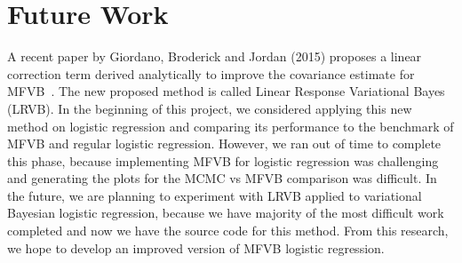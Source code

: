 
\section{Future Work}\label{sec:future}

A recent paper by Giordano, Broderick and Jordan (2015) proposes a linear correction term derived analytically to improve the covariance estimate for MFVB~\cite{giordano2015linear}.  The new proposed method is called Linear Response Variational Bayes (LRVB).  In the beginning of this project, we considered applying this new method on logistic regression and comparing its performance to the benchmark of MFVB and regular logistic regression.  However, we ran out of time to complete this phase, because implementing MFVB for logistic regression was challenging and generating the plots for the MCMC vs MFVB comparison was difficult.  In the future, we are planning to experiment with LRVB applied to variational Bayesian logistic regression, because we have majority of the most difficult work completed and now we have the source code for this method.  From this research, we hope to develop an improved version of MFVB logistic regression.
